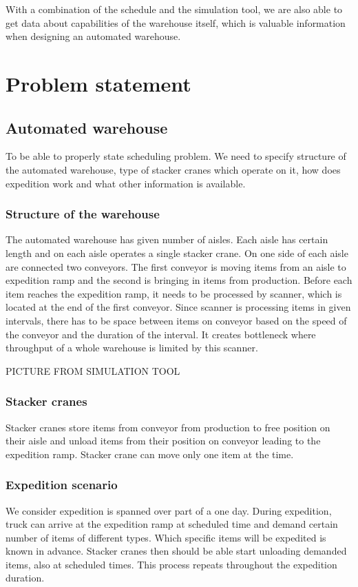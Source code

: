 \documentclass{ctuthesis}
\begin{document}
With a combination of the schedule and the simulation tool, we are also able to get data about capabilities of the warehouse itself, which is valuable information when designing an automated warehouse.

\chapter{Problem statement}
\section{Automated warehouse}
To be able to properly state scheduling problem. We need to specify structure of the automated warehouse, type of stacker cranes which operate on it, how does expedition work and what other information is available.

\subsection{Structure of the warehouse}

The automated warehouse has given number of aisles. Each aisle has certain length and on each aisle operates a single stacker crane. On one side of each aisle are connected two conveyors. The first conveyor is moving items from an aisle to expedition ramp and the second is bringing in items from production. Before each item reaches the expedition ramp, it needs to be processed by scanner, which is located at the end of the first conveyor. Since scanner is processing items in given intervals, there has to be space between items on conveyor based on the speed of the conveyor and the duration of the interval. It creates bottleneck where throughput of a whole warehouse is limited by this scanner.


PICTURE FROM SIMULATION TOOL
\subsection{Stacker cranes}
Stacker cranes store items from conveyor from production to free position on their aisle and unload items from their position on conveyor leading to the expedition ramp. Stacker crane can move only one item at the time. 
\subsection{Expedition scenario}
We consider expedition is spanned over part of a one day. During expedition, truck can arrive at the expedition ramp at scheduled time and demand certain number of items of different types. Which specific items will be expedited is known in advance. Stacker cranes then should be able start unloading demanded items, also at scheduled times. This process repeats throughout the expedition duration. 
\end{document}
